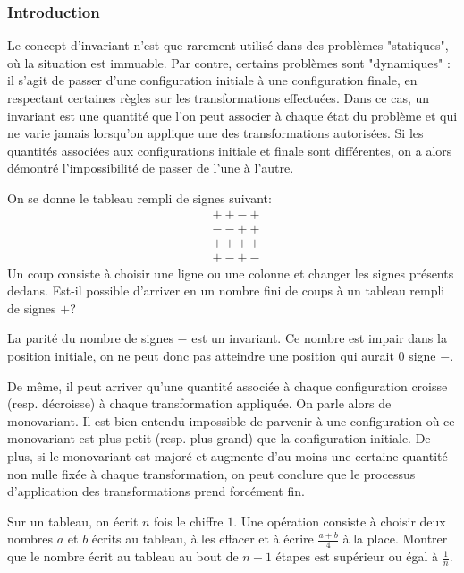 
\subsubsection{Introduction}
Le concept d'invariant n'est que rarement utilisé dans des problèmes "statiques", où la situation est immuable. Par contre, certains problèmes sont "dynamiques" : il s'agit de passer d'une configuration initiale à une configuration finale, en respectant certaines règles sur les transformations effectuées. Dans ce cas, un invariant est une quantité que l'on peut associer à chaque état du problème et qui ne varie jamais lorsqu'on applique une des transformations autorisées. Si les quantités associées aux configurations initiale et finale sont différentes, on a alors démontré l'impossibilité de passer de l'une à l'autre.\\

\begin{exo}
On se donne le tableau rempli de signes suivant:
\begin{align*}
& ++-+\\
& --++\\
&++++\\
& +-+-
\end{align*}
Un coup consiste à choisir une ligne ou une colonne et changer les signes présents dedans. Est-il possible d'arriver en un nombre fini de coups à un tableau rempli de signes $+$?
\end{exo}

\begin{sol}
La parité du nombre de signes $-$ est un invariant. Ce nombre est impair dans la position initiale, on ne peut donc pas atteindre une position qui aurait $0$ signe $-$.
\end{sol}


De même, il peut arriver qu'une quantité associée à chaque configuration croisse (resp. décroisse) à chaque transformation appliquée. On parle alors de monovariant. Il est bien entendu impossible de parvenir à une configuration où ce monovariant est plus petit (resp. plus grand) que la configuration initiale. De plus, si le monovariant est majoré et augmente d'au moins une certaine quantité non nulle fixée à chaque transformation, on peut conclure que le processus d'application des transformations prend forcément fin.\\

\begin{exo}
Sur un tableau, on écrit $n$ fois le chiffre $1$. Une opération consiste à choisir deux nombres $a$ et $b$ écrits au tableau, à les effacer et à écrire $\frac{a+b}{4}$ à la place. Montrer que le nombre écrit au tableau au bout de $n-1$ étapes est supérieur ou égal à $\frac1{n}$.
\end{exo}

